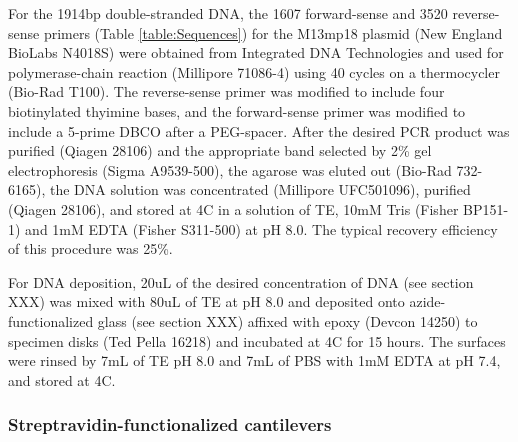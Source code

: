 \documentclass[%
  aip,12pt,tightenlines,
  amsthm,
 amsmath,amssymb
]{article}
\newcommand{\tRef}[1]{Table \ref{table:#1}}
\newcommand{\sLabel}[1]{\label{section:#1}}
\newcommand{\firstp}[0]{}
\newcommand{\pl}[0]{\vspace{6pt}}
\newcommand{\supply}[2]{(#1 #2)}
\newcommand{\degreeC}[0]{\degree{}C}
\begin{document}
\firstp For the 1914bp double-stranded DNA, the 1607 forward-sense and 3520 reverse-sense primers (\tRef{Sequences}) for the M13mp18 plasmid \supply{New England BioLabs}{N4018S} were obtained from Integrated DNA Technologies  and used for polymerase-chain reaction \supply{Millipore}{71086-4} using 40 cycles on a thermocycler \supply{Bio-Rad}{T100}. The reverse-sense primer was modified to include four biotinylated thyimine bases, and the forward-sense primer was modified to include a 5-prime DBCO after a PEG-spacer. After the desired PCR product was purified \supply{Qiagen}{28106} and the appropriate band selected by 2\% gel electrophoresis \supply{Sigma}{A9539-500}, the agarose was eluted out \supply{Bio-Rad}{732-6165}, the DNA solution was concentrated \supply{Millipore}{UFC501096}, purified \supply{Qiagen}{28106}, and stored at 4\degreeC{} in a solution of TE, 10mM Tris \supply{Fisher}{BP151-1} and 1mM EDTA \supply{Fisher}{S311-500} at pH 8.0. The typical recovery efficiency of this procedure was 25\%. \pl 

For DNA deposition, 20uL of the desired concentration of DNA (see section XXX) was mixed with 80uL of TE at pH 8.0 and deposited onto azide-functionalized glass (see section XXX) affixed with epoxy \supply{Devcon}{14250} to specimen disks \supply{Ted Pella}{16218} and incubated at 4C for 15 hours. The surfaces were rinsed by 7mL of TE pH 8.0 and 7mL of PBS with 1mM EDTA at pH 7.4, and stored at 4\degreeC{}. 

\subsubsection{\sLabel{Cantilevers}Streptravidin-functionalized cantilevers}
\end{document}

